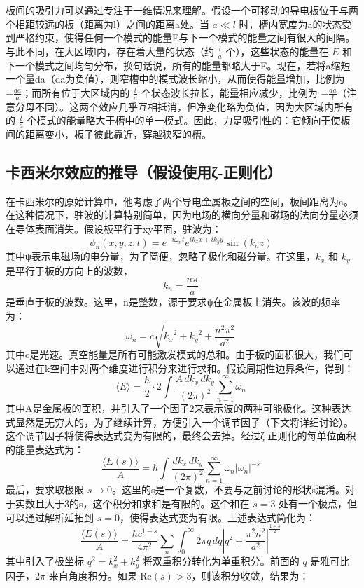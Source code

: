 板间的吸引力可以通过专注于一维情况来理解。假设一个可移动的导电板位于与两个相距较远的板（距离为l）之间的距离a处。当 \( a \ll l \) 时，槽内宽度为a的状态受到严格约束，使得任何一个模式的能量E与下一个模式的能量之间有很大的间隔。与此不同，在大区域l内，存在着大量的状态（约 \( \frac{l}{a} \) 个），这些状态的能量在 \( E \) 和下一个模式之间均匀分布，换句话说，所有的能量都略大于E。现在，若将a缩短一个量da（da为负值），则窄槽中的模式波长缩小，从而使得能量增加，比例为 \( -\frac{da}{a} \)；而所有位于大区域内的 \( \frac{l}{a} \) 个状态波长拉长，能量相应减少，比例为 \( -\frac{da}{l} \)（注意分母不同）。这两个效应几乎互相抵消，但净变化略为负值，因为大区域内所有的 \( \frac{l}{a} \) 个模式的能量略大于槽中的单一模式。因此，力是吸引性的：它倾向于使板间的距离变小，板子彼此靠近，穿越狭窄的槽。
\subsection{卡西米尔效应的推导（假设使用ζ-正则化）}
在卡西米尔的原始计算中，他考虑了两个导电金属板之间的空间，板间距离为a。在这种情况下，驻波的计算特别简单，因为电场的横向分量和磁场的法向分量必须在导体表面消失。假设板平行于xy平面，驻波为：
\[
\psi_n(x, y, z; t) = e^{-i\omega_n t} e^{i k_x x + i k_y y} \sin(k_n z)~
\]
其中ψ表示电磁场的电分量，为了简便，忽略了极化和磁分量。在这里，\( k_x \) 和 \( k_y \) 是平行于板的方向上的波数，
\[
k_n = \frac{n\pi}{a}~
\]
是垂直于板的波数。这里，n是整数，源于要求ψ在金属板上消失。该波的频率为：
\[
\omega_n = c \sqrt{{k_x}^2 + {k_y}^2 + \frac{n^2 \pi^2}{a^2}}~
\]
其中c是光速。真空能量是所有可能激发模式的总和。由于板的面积很大，我们可以通过在k空间中对两个维度进行积分来进行求和。假设周期性边界条件，得到：
\[
\langle E \rangle = \frac{\hbar}{2} \cdot 2 \int \frac{A \, dk_x \, dk_y}{(2\pi)^2} \sum_{n=1}^{\infty} \omega_n~
\]
其中A是金属板的面积，并引入了一个因子2来表示波的两种可能极化。这种表达式显然是无穷大的，为了继续计算，方便引入一个调节因子（下文将详细讨论）。这个调节因子将使得表达式变为有限的，最终会去掉。经过ζ-正则化的每单位面积的能量表达式为：
\[
\frac{\langle E(s)\rangle}{A} = \hbar \int \frac{dk_x \, dk_y}{(2\pi)^2} \sum_{n=1}^{\infty} \omega_n \left|\omega_n\right|^{-s}~
\]
最后，要求取极限 \(s \to 0\)。这里的s是一个复数，不要与之前讨论的形状s混淆。对于实数且大于3的s，这个积分和求和是有限的。这个和在 \(s = 3\) 处有一个极点，但可以通过解析延拓到 \(s = 0\)，使得表达式变为有限。上述表达式简化为：
\[
\frac{\langle E(s)\rangle}{A} = \frac{\hbar c^{1-s}}{4\pi^2} \sum_{n} \int_0^\infty 2\pi q \, dq \left| q^2 + \frac{\pi^2 n^2}{a^2} \right|^{\frac{1-s}{2}}~
\]
其中引入了极坐标 \(q^2 = k_x^2 + k_y^2\) 将双重积分转化为单重积分。前面的 \(q\) 是雅可比因子，\(2\pi\) 来自角度积分。如果 \(\text{Re}(s) > 3\)，则该积分收敛，结果为：
